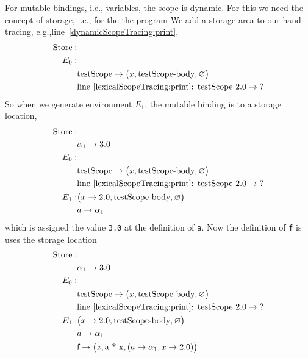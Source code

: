 For mutable bindings, i.e., variables, the scope is dynamic. For this we need the concept of storage, i.e., for the the program
%
%
We add a storage area to our hand tracing, e.g.,line~\ref{dynamicScopeTracing:print},
\begin{align*}
  \text{Store}: &\\
  E_0:&\\
      &\text{testScope} \rightarrow \big(x, \text{testScope-body}, \varnothing\big)\\
      & \text{line~\ref{lexicalScopeTracing:print}: testScope 2.0} \rightarrow \text{?}\\
\end{align*}
So when we generate environment $E_1$, the mutable binding is to a storage location,
\begin{align*}
  \text{Store}: &\\
  & \alpha_1 \rightarrow 3.0\\
  E_0:&\\
      &\text{testScope} \rightarrow \big(x, \text{testScope-body}, \varnothing\big)\\
      & \text{line~\ref{lexicalScopeTracing:print}: testScope 2.0} \rightarrow \text{?}\\
  E_1: & \big(x\rightarrow 2.0, \text{testScope-body}, \varnothing\big)\\
      & a \rightarrow \alpha_1\\
\end{align*}
which is assigned the value \lstinline!3.0! at the definition of \lstinline!a!. Now the definition of \lstinline!f! is uses the storage location
\begin{align*}
  \text{Store}: &\\
  & \alpha_1 \rightarrow 3.0\\
  E_0:&\\
      &\text{testScope} \rightarrow \big(x, \text{testScope-body}, \varnothing\big)\\
      & \text{line~\ref{lexicalScopeTracing:print}: testScope 2.0} \rightarrow \text{?}\\
  E_1: & \big(x\rightarrow 2.0, \text{testScope-body}, \varnothing\big)\\
      & a \rightarrow \alpha_1\\
      & \text{f} \rightarrow \big(z, \text{a * x}, (a \rightarrow \alpha_1, x\rightarrow 2.0)\big)\\
\end{align*}
